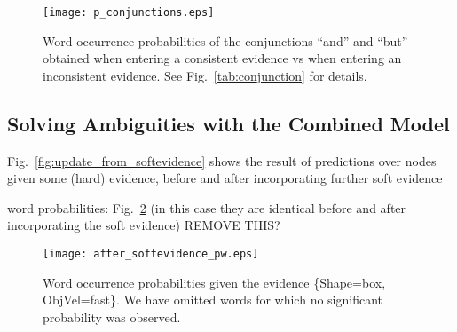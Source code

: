 

\begin{figure}
\centering
\texttt{[image: p\_conjunctions.eps]}
\caption{Word occurrence probabilities of the conjunctions ``and'' and ``but'' obtained when entering a consistent \actioneffect{} evidence vs when entering an inconsistent \actioneffect{} evidence. See Fig.~\ref{tab:conjunction} for details.}
\label{fig:p_conjunctions}
\end{figure}

\subsection{Solving Ambiguities with the Combined Model}

Fig.~\ref{fig:update_from_softevidence} shows the result of predictions over nodes given some (hard) evidence, before and after incorporating further soft evidence

\begin{figure*}
    \centering
     \quad
    \caption{Predictions about the action and hand velocity on a box object, before and after incorporating Action soft evidence from Gesture \acp{HMM}.}
    \label{fig:update_from_softevidence}
\end{figure*}

word probabilities: Fig.~\ref{fig:after_softevidence:pw} (in this case they are identical before and after incorporating the soft evidence) REMOVE THIS?

\begin{figure}
\centering
\texttt{[image: after\_softevidence\_pw.eps]}
\caption{Word occurrence probabilities given the evidence \{Shape=box, ObjVel=fast\}. We have omitted words for which no significant probability was observed.}
\label{fig:after_softevidence:pw}
\end{figure}
